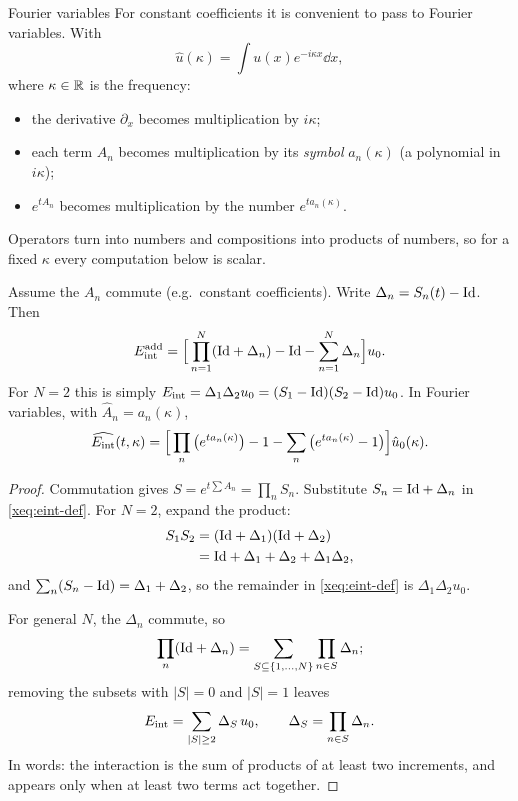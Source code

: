 \begin{notebox}{Fourier variables}
For constant coefficients it is convenient to pass to Fourier variables. With
\[
\hat u(\kappa)=\int u(x)e^{-i\kappa x}\dd x,
\]
where $\kappa\in\mathbb{R}$ is the frequency:
\begin{itemize}[nosep]
\item the derivative $\partial_x$ becomes multiplication by $i\kappa$;
\item each term $A_n$ becomes multiplication by its \emph{symbol} $a_n(\kappa)$ (a polynomial in $i\kappa$);
\item $e^{tA_n}$ becomes multiplication by the number $e^{ta_n(\kappa)}$.
\end{itemize}
Operators turn into numbers and compositions into products of numbers, so for a fixed $\kappa$ every computation below is scalar.
\end{notebox}
\begin{theorem}\label{xthm:eint}
Assume the $A_n$ commute (e.g.\ constant coefficients). Write $\Delta_n=S_n(t)-\mathrm{Id}$. Then
\begin{equation}\label{eq:eint}
E_{\mathrm{int}}^{\mathrm{add}}=\Big[\prod_{n=1}^N(\mathrm{Id}+\Delta_n)-\mathrm{Id}-\sum_{n=1}^N\Delta_n\Big]u_0 .
\end{equation}
For $N=2$ this is simply $E_{\mathrm{int}}=\Delta_1\Delta_2u_0=(S_1-\mathrm{Id})(S_2-\mathrm{Id})u_0$. In Fourier variables, with $\hat A_n=a_n(\kappa)$,
\[
\widehat{E_{\mathrm{int}}}(t,\kappa)=\Big[\prod_n\big(e^{ta_n(\kappa)}\big)-1-\sum_n\big(e^{ta_n(\kappa)}-1\big)\Big]\hat u_0(\kappa).
\]
\end{theorem}
\begin{proof}
Commutation gives $S=e^{t\sum A_n}=\prod_nS_n$. Substitute $S_n=\mathrm{Id}+\Delta_n$ in \eqref{xeq:eint-def}. For $N=2$, expand the product:
\[
\begin{aligned}
S_1S_2&=(\mathrm{Id}+\Delta_1)(\mathrm{Id}+\Delta_2)\\
&=\mathrm{Id}+\Delta_1+\Delta_2+\Delta_1\Delta_2 ,
\end{aligned}
\]
and $\sum_n(S_n-\mathrm{Id})=\Delta_1+\Delta_2$, so the remainder in \eqref{xeq:eint-def} is $\Delta_1\Delta_2u_0$.

For general $N$, the $\Delta_n$ commute, so
\[
\prod_n(\mathrm{Id}+\Delta_n)=\sum_{S\subseteq\{1,\dots,N\}}\prod_{n\in S}\Delta_n ;
\]
removing the subsets with $|S|=0$ and $|S|=1$ leaves
\[
E_{\mathrm{int}}=\sum_{|S|\ge2}\Delta_S\,u_0,\qquad \Delta_S=\prod_{n\in S}\Delta_n .
\]
In words: the interaction is the sum of products of at least two increments, and appears only when at least two terms act together.
\end{proof}

